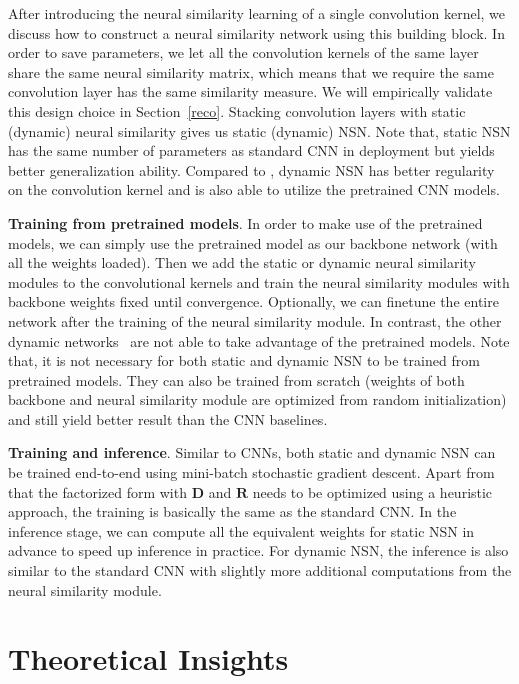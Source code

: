 After introducing the neural similarity learning of a single convolution kernel, we discuss how to construct a neural similarity network using this building block. In order to save parameters, we let all the convolution kernels of the same layer share the same neural similarity matrix, which means that we require the same convolution layer has the same similarity measure. We will empirically validate this design choice in Section~\ref{reco}. Stacking convolution layers with static (dynamic) neural similarity gives us static (dynamic) NSN. Note that, static NSN has the same number of parameters as standard CNN in deployment but yields better generalization ability. Compared to \cite{jia2016dynamic}, dynamic NSN has better regularity on the convolution kernel and is also able to utilize the pretrained CNN models.
\par
\textbf{Training from pretrained models}. In order to make use of the pretrained models, we can simply use the pretrained model as our backbone network (with all the weights loaded). Then we add the static or dynamic neural similarity modules to the convolutional kernels and train the neural similarity modules with backbone weights fixed until convergence. Optionally, we can finetune the entire network after the training of the neural similarity module. In contrast, the other dynamic networks~\cite{ha2016hypernetworks,jia2016dynamic} are not able to take advantage of the pretrained models. Note that, it is not necessary for both static and dynamic NSN to be trained from pretrained models. They can also be trained from scratch (weights of both backbone and neural similarity module are optimized from random initialization) and still yield better result than the CNN baselines.
\par
\textbf{Training and inference}. Similar to CNNs, both static and dynamic NSN can be trained end-to-end using mini-batch stochastic gradient descent. Apart from that the factorized form with $\bm{D}$ and $\bm{R}$ needs to be optimized using a heuristic approach, the training is basically the same as the standard CNN. In the inference stage, we can compute all the equivalent weights for static NSN in advance to speed up inference in practice. For dynamic NSN, the inference is also similar to the standard CNN with slightly more additional computations from the neural similarity module.

\section{Theoretical Insights}

